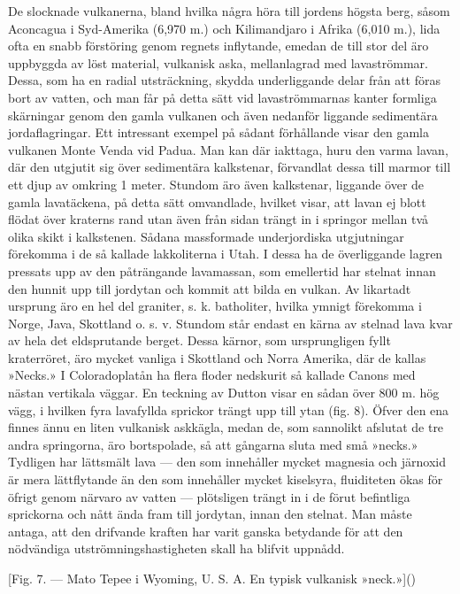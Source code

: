 \documentclass[a4paper, 12pt, oneside, swedish]{article}
\begin{document}
De slocknade vulkanerna, bland hvilka några höra till jordens högsta berg, såsom Aconcagua i Syd-Amerika (6,970 m.) och Kilimandjaro i Afrika (6,010 m.), lida ofta en snabb förstöring genom regnets inflytande, emedan de till stor del äro uppbyggda av löst material, vulkanisk aska, mellanlagrad med lavaströmmar. Dessa, som ha en radial utsträckning, skydda underliggande delar från att föras bort av vatten, och man får på detta sätt vid lavaströmmarnas kanter formliga skärningar genom den gamla vulkanen och även nedanför liggande sedimentära jordaflagringar. Ett intressant exempel på sådant förhållande visar den gamla vulkanen Monte Venda vid Padua. Man kan där iakttaga, huru den varma lavan, där den utgjutit sig över sedimentära kalkstenar, förvandlat dessa till marmor till ett djup av omkring 1 meter. Stundom äro även kalkstenar, liggande över de gamla lavatäckena, på detta sätt omvandlade, hvilket visar, att lavan ej blott flödat över kraterns rand utan även från sidan trängt in i springor mellan två olika skikt i kalkstenen. Sådana massformade underjordiska utgjutningar förekomma i de så kallade lakkoliterna i Utah. I dessa ha de överliggande lagren pressats upp av den påträngande lavamassan, som emellertid har stelnat innan den hunnit upp till jordytan och kommit att bilda en vulkan. Av likartadt ursprung äro en hel del graniter, s. k. batholiter, hvilka ymnigt förekomma i Norge, Java, Skottland o. s. v. Stundom står endast en kärna av stelnad lava kvar av hela det eldsprutande berget. Dessa kärnor, som ursprungligen fyllt kraterröret, äro mycket vanliga i Skottland och Norra Amerika, där de kallas »Necks.» I Coloradoplatån ha flera floder nedskurit så kallade Canons med nästan vertikala väggar. En teckning av Dutton visar en sådan över 800 m. hög vägg, i hvilken fyra lavafyllda sprickor trängt upp till ytan (fig. 8). Öfver den ena finnes ännu en liten vulkanisk askkägla, medan de, som sannolikt afslutat de tre andra springorna, äro bortspolade, så att gångarna sluta med små »necks.» Tydligen har lättsmält lava --- den som innehåller mycket magnesia och järnoxid är mera lättflytande än den som innehåller mycket kiselsyra, fluiditeten ökas för öfrigt genom närvaro av vatten --- plötsligen trängt in i de förut befintliga sprickorna och nått ända fram till jordytan, innan den stelnat. Man måste antaga, att den drifvande kraften har varit ganska betydande för att den nödvändiga utströmningshastigheten skall ha blifvit uppnådd.

[Fig. 7. --- Mato Tepee i Wyoming, U. S. A. En typisk vulkanisk »neck.»]()
\end{document}
